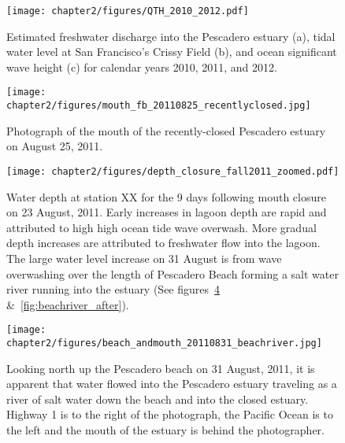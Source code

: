 {%
\begin{figure}
	\begin{center}
		\texttt{[image: chapter2/figures/QTH\_2010\_2012.pdf]} \caption{Estimated freshwater discharge into the Pescadero estuary (a), tidal water level at San Francisco's Crissy Field (b), and ocean significant wave height (c) for calendar years 2010, 2011, and 2012.}\label{fig:QTH_2010_2012}  
	\end{center}
\end{figure}

\begin{figure}
	\begin{center}
		\texttt{[image: chapter2/figures/mouth\_fb\_20110825\_recentlyclosed.jpg]} \caption{Photograph of the mouth of the recently-closed Pescadero estuary on August 25, 2011.}
	\end{center}
\label{fig:mouth_fb_20110825} \end{figure}


\begin{figure}
	\begin{center}
		\texttt{[image: chapter2/figures/depth\_closure\_fall2011\_zoomed.pdf]} \caption{Water depth at station XX for the 9 days following mouth closure on 23 August, 2011. Early increases in lagoon depth are rapid and attributed to high high ocean tide wave overwash. More gradual depth increases are attributed to freshwater flow into the lagoon. The large water level increase on 31 August is from wave overwashing over the length of Pescadero Beach forming a salt water river running into the estuary (See figures~\ref{fig:beachriver} \&~\ref{fig:beachriver_after}).}
	\end{center}
\label{fig:depthclosuref11} \end{figure}


\begin{figure}
	\begin{center}
		\texttt{[image: chapter2/figures/beach\_andmouth\_20110831\_beachriver.jpg]} \caption{Looking north up the Pescadero beach on 31 August, 2011, it is apparent that water flowed into the Pescadero estuary traveling as a river of salt water down the beach and into the closed estuary. Highway 1 is to the right of the photograph, the Pacific Ocean is to the left and the mouth of the estuary is behind the photographer.}
	\end{center} \label{fig:beachriver} 
\end{figure}

}
